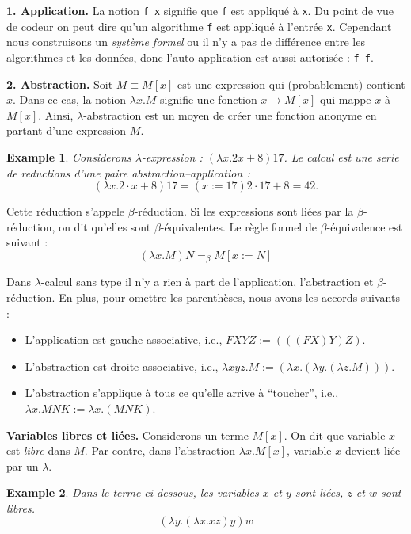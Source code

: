 \documentclass[12pt, a4paper]{article}
\newtheorem*{example}{Example}
\begin{document}
\textbf{1. Application.} La notion \verb|f x| signifie que \verb|f| est appliqué à \verb|x|. Du point de vue de codeur on peut dire qu'un algorithme \verb|f| est appliqué à l'entrée \verb|x|. Cependant nous construisons un \emph{système formel} ou il n'y a pas de différence entre les algorithmes et les données, donc l'auto-application est aussi autorisée : \verb|f f|.

\textbf{2. Abstraction.} Soit $M \equiv M[x]$ est une expression qui (probablement) contient $x$. Dans ce cas, la notion $\lambda x.M$ signifie une fonction $x \to M[x]$ qui mappe $x$ à $M[x]$.
Ainsi, $\lambda$-abstraction est un moyen de créer une fonction anonyme en partant d'une expression $M$.
\begin{example}
	Considerons $\lambda$-expression : $(\lambda x.2x + 8)17$.
	Le calcul est une serie de reductions d'une paire abstraction--application :
	$$(\lambda x.2 \cdot x + 8)17 =(x:=17) 2 \cdot 17 + 8 = 42.$$
\end{example}
Cette réduction s'appele $\beta$-réduction.
Si les expressions sont liées par la $\beta$-réduction, on dit qu'elles sont $\beta$-équivalentes.
Le règle formel de $\beta$-équivalence est suivant :
$$(\lambda x.M)N =_\beta M[x:=N]$$

Dans $\lambda$-calcul sans type il n'y a rien à part de l'application, l'abstraction et $\beta$-réduction.
En plus, pour omettre les parenthèses, nous avons les accords suivants :
\begin{itemize}
	\item L'application est gauche-associative, i.e., $F X Y Z := (((F X) Y) Z)$.
	\item L'abstraction est droite-associative, i.e., $\lambda x y z.M := (\lambda x.(\lambda y.(\lambda z.M)))$.
	\item L'abstraction s'applique à tous ce qu'elle arrive à ``toucher'', i.e., $\lambda x. M N K := \lambda x.(MNK)$.
\end{itemize}
\textbf{Variables libres et liées.}
Considerons un terme $M[x]$. On dit que variable $x$ est \emph{libre} dans $M$.
Par contre, dans l'abstraction $\lambda x.M[x]$, variable $x$ devient liée par un $\lambda$.
\begin{example}
	Dans le terme ci-dessous, les variables $x$ et $y$ sont liées, $z$ et $w$ sont libres.
	$$(\lambda y. (\lambda x. xz)y)w$$
\end{example}
\end{document}

